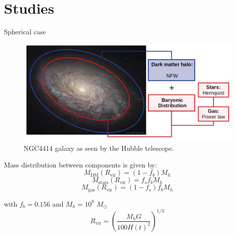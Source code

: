 \documentclass{beamer}
\newcommand{\sm}[0]{$M_\odot$}
\begin{document}
\section{Studies}
\begin{frame}{Spherical case}
	\begin{figure}[h]
		\centering
		\includegraphics[width=0.8\linewidth]{../Documento/Figures/NGC4414_modified}
		\caption{NGC4414 galaxy as seen by the Hubble telescope.}
	\end{figure}
\end{frame}

\begin{frame}
	Mass distribution between components is given by:
	\begin{equation}
		M_\text{DM}(R_\text{vir}) = (1 - f_b)M_h
	\end{equation}
	\begin{equation}
		M_\text{stars}(R_\text{vir}) = f_sf_bM_h
	\end{equation}
	\begin{equation}
		M_\text{gas}(R_\text{vir}) = (1 - f_s)f_bM_h
	\end{equation}
	
	with $f_b = 0.156$ and $M_h = 10^8$ \sm
	\begin{equation}
		R_\text{vir} = \left({\dfrac{M_hG}{100 H(t)^2}}\right)^{1/3}
	\end{equation}
\end{frame}
\end{document}

